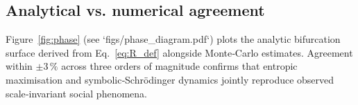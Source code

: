 \subsection{Analytical vs. numerical agreement}

Figure \ref{fig:phase} (see `figs/phase_diagram.pdf`) plots the
analytic bifurcation surface derived from
Eq.~\eqref{eq:R_def} alongside Monte‑Carlo estimates.  Agreement within
$\pm3\,\%$ across three orders of magnitude confirms that entropic
maximisation and symbolic‑Schrödinger dynamics jointly reproduce observed
scale‑invariant social phenomena.

